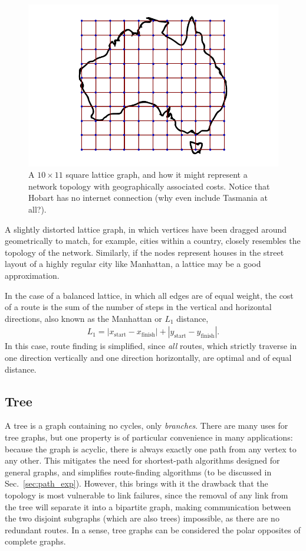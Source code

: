 \documentclass[aps, rmp, twocolumn, amsmath, amssymb, nofootinbib, superscriptaddress, longbibliography, floatfix, table-of-contents, eqsecnum]{revtex4-1}
\begin{document}
\begin{figure}[!htb]
\includegraphics[width=0.7\columnwidth]{lattice}
\caption{A \mbox{$10\times 11$} square lattice graph, and how it might represent a network topology with geographically associated costs. Notice that Hobart has no internet connection (why even include Tasmania at all?).} \label{fig:lattice}
\end{figure}

A slightly distorted lattice graph, in which vertices have been dragged around geometrically to match, for example, cities within a country, closely resembles the topology of the network. Similarly, if the nodes represent houses in the street layout of a highly regular city like Manhattan, a lattice may be a good approximation.

In the case of a balanced lattice, in which all edges are of equal weight, the cost of a route is the sum of the number of steps in the vertical and horizontal directions, also known as the Manhattan or $L_1$ distance,
\begin{align}
L_1 = |x_\text{start} - x_\text{finish}| + |y_\text{start} - y_\text{finish}|.
\end{align}
In this case, route finding is simplified, since \textit{all} routes, which strictly traverse in one direction vertically and one direction horizontally, are optimal and of equal distance.

%
%

\subsection{Tree} \label{sec:tree_graph} 

A tree is a graph containing no cycles, only \textit{branches}. There are many uses for tree graphs, but one property is of particular convenience in many applications: because the graph is acyclic, there is always exactly one path from any vertex to any other. This mitigates the need for shortest-path algorithms designed for general graphs, and simplifies route-finding algorithms (to be discussed in Sec.~\ref{sec:path_exp}). However, this brings with it the drawback that the topology is most vulnerable to link failures, since the removal of any link from the tree will separate it into a bipartite graph, making communication between the two disjoint subgraphs (which are also trees) impossible, as there are no redundant routes. In a sense, tree graphs can be considered the polar opposites of complete graphs.
\end{document}
